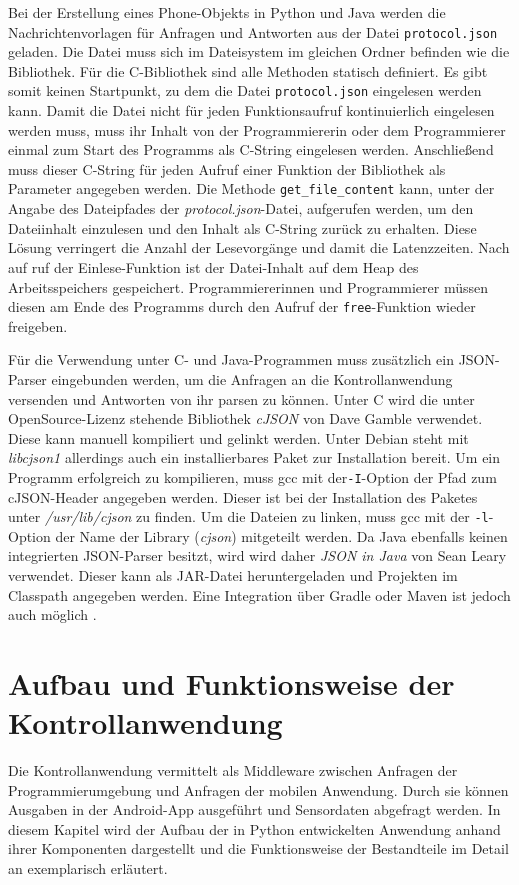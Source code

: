 \documentclass[11pt,a4paper]{report}
\begin{document}
Bei der Erstellung eines Phone-Objekts in Python und Java werden die Nachrichtenvorlagen für Anfragen und Antworten aus der Datei \texttt{protocol.json} geladen.
Die Datei muss sich im Dateisystem im gleichen Ordner befinden wie die Bibliothek.
Für die C-Bibliothek sind alle Methoden statisch definiert.
Es gibt somit keinen Startpunkt, zu dem die Datei \texttt{protocol.json} eingelesen werden kann.
Damit die Datei nicht für jeden Funktionsaufruf kontinuierlich eingelesen werden muss, muss ihr Inhalt von der Programmiererin oder dem Programmierer einmal zum Start des Programms als C-String eingelesen werden.
Anschließend muss dieser C-String für jeden Aufruf einer Funktion der Bibliothek als Parameter angegeben werden.
Die Methode \texttt{get\_file\_content} kann, unter der Angabe des Dateipfades der \textit{protocol.json}-Datei, aufgerufen werden, um den Dateiinhalt einzulesen und den Inhalt als C-String zurück zu erhalten.
Diese Lösung verringert die Anzahl der Lesevorgänge und damit die Latenzzeiten.
Nach auf ruf der Einlese-Funktion ist der Datei-Inhalt auf dem Heap des Arbeitsspeichers gespeichert.
Programmiererinnen und Programmierer müssen diesen am Ende des Programms durch den Aufruf der \texttt{free}-Funktion wieder freigeben.

Für die Verwendung unter C- und Java-Programmen muss zusätzlich ein JSON-Parser eingebunden werden, um die Anfragen an die Kontrollanwendung versenden und Antworten von ihr parsen zu können.
Unter C wird die unter OpenSource-Lizenz stehende Bibliothek \textit{cJSON} von Dave Gamble \cite{cjson} verwendet.
Diese kann manuell kompiliert und gelinkt werden.
Unter Debian steht mit \textit{libcjson1} \cite{cjson-package} allerdings auch ein installierbares Paket zur Installation bereit.
Um ein Programm erfolgreich zu kompilieren, muss gcc mit der\texttt{-I}-Option der Pfad zum cJSON-Header angegeben werden.
Dieser ist bei der Installation des Paketes unter \textit{/usr/lib/cjson} zu finden.
Um die Dateien zu linken, muss gcc mit der \texttt{-l}-Option der Name der Library (\textit{cjson}) mitgeteilt werden.
Da Java ebenfalls keinen integrierten JSON-Parser besitzt, wird wird daher \textit{JSON in Java} \cite{json_java} von Sean Leary verwendet.
Dieser kann als JAR-Datei heruntergeladen und Projekten im Classpath angegeben werden.
Eine Integration über Gradle oder Maven ist jedoch auch möglich \cite{json_java_maven}.

\chapter{Aufbau und Funktionsweise der Kontrollanwendung}\label{chap:server_software}
Die Kontrollanwendung vermittelt als Middleware zwischen Anfragen der Programmierumgebung und Anfragen der mobilen Anwendung.
Durch sie können Ausgaben in der Android-App ausgeführt und Sensordaten abgefragt werden.
In diesem Kapitel wird der Aufbau der in Python entwickelten Anwendung anhand ihrer Komponenten dargestellt und die Funktionsweise der Bestandteile im Detail an exemplarisch erläutert.
\end{document}
